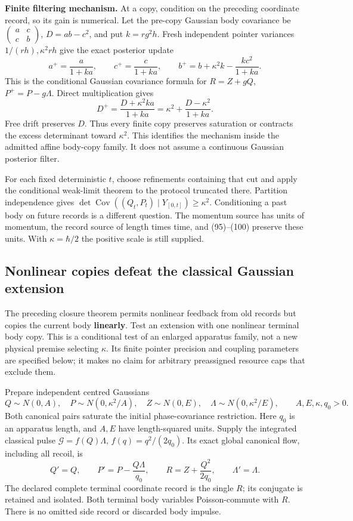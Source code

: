 \documentclass[11pt,a4paper]{article}
\begin{document}
\textbf{Finite filtering mechanism.} At a copy, condition on the
preceding coordinate record, so its gain is numerical. Let the pre-copy
Gaussian body covariance be
\(\left(\begin{smallmatrix}a&c\\c&b\end{smallmatrix}\right)\),
\(D=ab-c^2\), and put \(k=rg^2h\). Fresh independent pointer variances
\(1/(rh),\kappa^2rh\) give the exact posterior update
\[a^+=\frac a{1+ka},\qquad c^+=\frac c{1+ka},\qquad
b^+=b+\kappa^2k-\frac{kc^2}{1+ka}.\tag{99}\] This is the conditional
Gaussian covariance formula for \(R=Z+gQ\), \(P^+=P-g\Lambda\). Direct
multiplication gives \[D^+=\frac{D+\kappa^2ka}{1+ka}
       =\kappa^2+\frac{D-\kappa^2}{1+ka}.\tag{100}\] Free drift
preserves \(D\). Thus every finite copy preserves saturation or
contracts the excess determinant toward \(\kappa^2\). This identifies
the mechanism inside the admitted affine body-copy family. It does not
assume a continuous Gaussian posterior filter.

For each fixed deterministic \(t\), choose refinements containing that
cut and apply the conditional weak-limit theorem to the protocol
truncated there. Partition independence gives
\(\det\operatorname{Cov}((Q_t,P_t)\mid Y_{[0,t]})\ge\kappa^2\).
Conditioning a past body on future records is a different question. The
momentum source has units of momentum, the record source of length times
time, and (95)--(100) preserve these units. With \(\kappa=\hbar/2\) the
positive scale is still supplied.

\hypertarget{nonlinear-copies-defeat-the-classical-gaussian-extension}{%
\subsection{Nonlinear copies defeat the classical Gaussian
extension}\label{nonlinear-copies-defeat-the-classical-gaussian-extension}}

The preceding closure theorem permits nonlinear feedback from old
records but copies the current body \textbf{linearly}. Test an extension
with one nonlinear terminal body copy. This is a conditional test of an
enlarged apparatus family, not a new physical premise selecting
\(\kappa\). Its finite pointer precision and coupling parameters are
specified below; it makes no claim for arbitrary preassigned resource
caps that exclude them.

Prepare independent centred Gaussians
\[Q\sim N(0,A),\quad P\sim N(0,\kappa^2/A),\quad
Z\sim N(0,E),\quad\Lambda\sim N(0,\kappa^2/E),
\qquad A,E,\kappa,q_0>0.\] Both canonical pairs saturate the initial
phase-covariance restriction. Here \(q_0\) is an apparatus length, and
\(A,E\) have length-squared units. Supply the integrated classical pulse
\(\mathcal G=f(Q)\Lambda\), \(f(q)=q^2/(2q_0)\). Its exact global
canonical flow, including all recoil, is
\[Q'=Q,\qquad P'=P-\frac{Q\Lambda}{q_0},\qquad
R=Z+\frac{Q^2}{2q_0},\qquad\Lambda'=\Lambda.\tag{101}\] The declared
complete terminal coordinate record is the single \(R\); its conjugate
is retained and isolated. Both terminal body variables Poisson-commute
with \(R\). There is no omitted side record or discarded body impulse.
\end{document}

